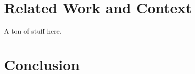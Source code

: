 \documentclass[authoryear,preprint]{sigplanconf}
\begin{document}
\section{Related Work and Context}

A ton of stuff here. 

\section{Conclusion}


\softraggedright

\end{document}
